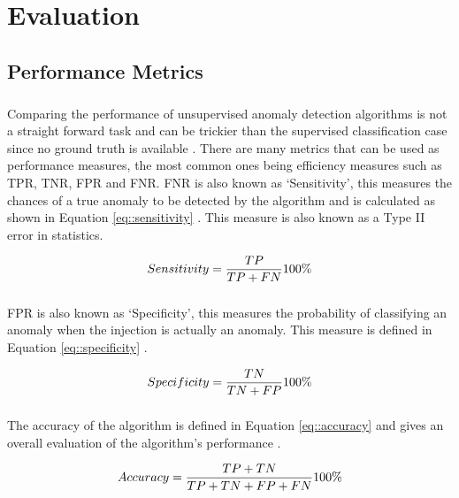 \chapter{Evaluation}
\label{chp5}

\section{Performance Metrics}

\paragraph{ }Comparing the performance of unsupervised anomaly detection algorithms is not a straight forward task and can be trickier than the supervised classification case since no ground truth is available \cite{Goldstein2016}. There are many metrics that can be used as performance measures, the most common ones being efficiency measures such as \ac{TPR}, \ac{TNR}, \ac{FPR} and \ac{FNR}. \acs{FNR} is also known as `Sensitivity', this measures the chances of a true anomaly to be detected by the algorithm and is calculated as shown in Equation \ref{eq::sensitivity} \cite{Danjuma2015}. This measure is also known as a Type II error in statistics.

\begin{equation}\label{eq::sensitivity}
\centering
Sensitivity=\frac{TP}{TP+FN}100\%
\end{equation}

\paragraph{ }\acs{FPR} is also known as `Specificity', this measures the probability of classifying an anomaly when the injection is actually an anomaly. This measure is defined in Equation \ref{eq::specificity} \cite{Danjuma2015}.

\begin{equation}\label{eq::specificity}
\centering
Specificity=\frac{TN}{TN+FP}100\%
\end{equation}

\paragraph{ }The accuracy of the algorithm is defined in Equation \ref{eq::accuracy} and gives an overall evaluation of the algorithm's performance \cite{Danjuma2015}.

\begin{equation}\label{eq::accuracy}
\centering
Accuracy=\frac{TP+TN}{TP+TN+FP+FN}100\%
\end{equation}

